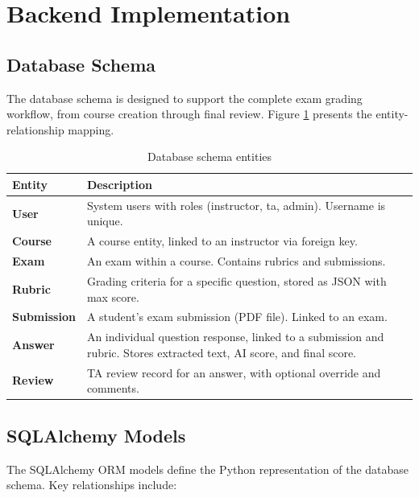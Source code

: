 \documentclass[11pt,a4paper]{article}
\begin{document}
\newpage
\section{Backend Implementation}
\label{sec:backend}

\subsection{Database Schema}
\label{subsec:database-schema}

The database schema is designed to support the complete exam grading workflow, from course creation through final review. Figure \ref{tab:schema} presents the entity-relationship mapping.

\begin{table}[H]
    \centering
    \caption{Database schema entities}
    \label{tab:schema}
    \begin{tabular}{@{}lp{9cm}@{}}
        \toprule
        \textbf{Entity} & \textbf{Description} \\
        \midrule
        \textbf{User} & System users with roles (instructor, ta, admin). Username is unique. \\
        \textbf{Course} & A course entity, linked to an instructor via foreign key. \\
        \textbf{Exam} & An exam within a course. Contains rubrics and submissions. \\
        \textbf{Rubric} & Grading criteria for a specific question, stored as JSON with max score. \\
        \textbf{Submission} & A student's exam submission (PDF file). Linked to an exam. \\
        \textbf{Answer} & An individual question response, linked to a submission and rubric. Stores extracted text, AI score, and final score. \\
        \textbf{Review} & TA review record for an answer, with optional override and comments. \\
        \bottomrule
    \end{tabular}
\end{table}

\subsection{SQLAlchemy Models}

The SQLAlchemy ORM models define the Python representation of the database schema. Key relationships include:
\end{document}
